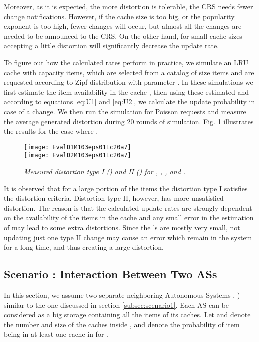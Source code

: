 \documentclass[conference]{IEEEtran}
\theoremstyle{plain}
\theoremstyle{remark}
\begin{document}
Moreover, as it is expected, the more distortion is tolerable, the CRS needs fewer change notifications. However, if the cache size is too big, or the popularity exponent is too high, fewer changes will occur, but almost all the changes are needed to be announced to the CRS. On the other hand, for small cache sizes accepting a little distortion will significantly decrease the update rate.

To figure out how the calculated rates perform in practice, we simulate an LRU cache with capacity  items, which are selected from a catalog of size  items and are requested according to Zipf distribution with parameter . In these simulations we first estimate the item availability in the cache , then using these estimated  and according to equations \ref{eq:U1} and \ref{eq:U2}, we calculate the update probability in case of a change. We then run the simulation for  Poisson requests and measure the average generated distortion during 20 rounds of simulation. Fig. \ref{fig:EvalDist1} illustrates the results for the case where .

\begin{figure}[http]
    \center
      \texttt{[image: EvalD1M103eps01Lc20a7]}\\
			\texttt{[image: EvalD2M103eps01Lc20a7]}\\
      \caption{\textit{Measured distortion type I () and II () for , , , and .}}
    \label{fig:EvalDist1}
\end{figure}

It is observed that for a large portion of the items the distortion type I satisfies the distortion criteria. Distortion type II, however, has more unsatisfied distortion. The reason is that the calculated update rates are strongly dependent on the availability of the items in the cache and any small error in the estimation of  may lead to some extra distortions. Since the 's are mostly very small, not updating just one type II change may cause an error which remain in the system for a long time, and thus creating a large distortion.



\subsection{Scenario : Interaction Between Two ASs}
\label{subsec:scenario2}

In this section, we assume two separate neighboring Autonomous Systems , ) similar to the one discussed in section \ref{subsec:scenario1}. Each AS can be considered as a big storage containing all the items of its caches. Let  and  denote the number and size of the caches inside , and  denote the probability of item  being in at least one cache in  for .
\end{document}
